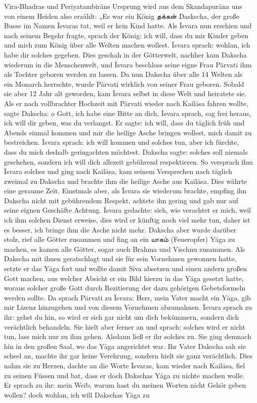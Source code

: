 \documentclass{article}
\newcommand{\TamilText}[1]{\texttamil{#1}}
\newcommand{\tam}[1]{\TamilText{#1}}
\begin{document}
V\={i}ra-Bhadras und Periyatambir\={a}ns Ursprung wird aus dem Skandapur\={a}na uns von einem Heiden also erzählt: „Es war ein König \tam{தக்கன்} Daskscha, der große Busse im Namen \={I}svaras tat, weil er kein Kind hatte. Als \={I}svara nun erschien und nach seinem Begehr fragte, sprach der König: ich will, dass du mir Kinder geben und mich zum König über alle Welten machen wollest. \={I}svara sprach: wohlan, ich habe dir solches gegeben. Dies geschah in der Götterwelt, nachher kam Dakscha wiederum in die Menschenwelt, und \={I}svara beschloss seine eigne Frau P\={a}rvati ihm als Tochter geboren werden zu lassen. Da nun Dakscha über alle 14 Welten als ein Monarch herrschte, wurde P\={a}rvati wirklich von seiner Frau geboren. Sobald sie aber 12 Jahr alt geworden, kam \={I}svara selbst in diese Welt und heiratete sie. Als er nach vollbrachter Hochzeit mit P\={a}rvati wieder nach Kail\={a}sa fahren wollte, sagte Dakscha: o Gott, ich habe eine Bitte an dich, \={I}svara sprach, sag frei heraus, ich will dir geben, was du verlangst. Er sagte: ich will, dass du täglich früh und Abends einmal kommen und mir die heilige Asche bringen wollest, mich damit zu bestreichen. \={I}svara sprach: ich will kommen und solches tun, aber ich fürchte, dass du mich deshalb geringachten möchtest. Dakscha sagte: solches soll niemals geschehen, sondern ich will dich allezeit gebührend respektieren. So versprach ihm \={I}svara solches und ging nach Kail\={a}sa, kam seinem Versprechen nach täglich zweimal zu Dakscha und brachte ihm die heilige Asche aus Kail\={a}sa. Dies währte eine geraume Zeit. Einstmals aber, als \={I}svara sie wiederum brachte, empfing ihn Dakscha nicht mit gebührendem Respekt, achtete ihn gering und gab nur auf seine eignen Geschäfte Achtung. \={I}svara gedachte: sieh, wie verachtet er mich, weil ich ihm solchen Dienst erweise, dies wird er künftig noch viel mehr tun, daher ist es besser, ich bringe ihm die Asche nicht mehr. Dakscha aber wurde darüber stolz, rief alle Götter zusammen und fing an ein \tam{யாகம்} (Feueropfer) Y\={a}ga zu machen, es kamen alle Götter, sogar auch Brahma und Vischnu zusammen. Als Dakscha mit ihnen geratschlagt und sie für sein Vornehmen gewonnen hatte, setzte er das Y\={a}ga fort und wollte damit Siva absetzen und einen andern großen Gott machen, aus welcher Absicht er ein Bild hierzu in das Y\={a}ga gesetzt hatte, woraus solcher große Gott durch Rezitierung der dazu gehörigen Gebetsformeln werden sollte. Da sprach P\={a}rvati zu \={I}svara: Herr, mein Vater macht ein Y\={a}ga, gib mir Lizenz hinzugehen und von diesem Vornehmen abzumahnen. \={I}svara sprach zu ihr: gehst du hin, so wird er sich gar nicht um dich bekümmern, sondern dich verächtlich behandeln. Sie hielt aber ferner an und sprach: solches wird er nicht tun, lass mich nur zu ihm gehen. Alsdann ließ er ihr solches zu. Sie ging demnach hin in den großen Saal, wo das Y\={a}ga angerichtet war. Ihr Vater Dakscha sah sie scheel an, machte ihr gar keine Verehrung, sondern hielt sie ganz verächtlich. Dies nahm sie zu Herzen, dachte an die Worte \={I}svaras, kam wieder nach Kail\={a}sa, fiel zu seinen Füssen und bat, dass er doch Dakschas Y\={a}ga zu nichte machen wolle. Er sprach zu ihr: mein Weib, warum hast du meinen Worten nicht Gehör geben wollen? doch wohlan, ich will Dakschas Y\={a}ga zu 
\end{document}
